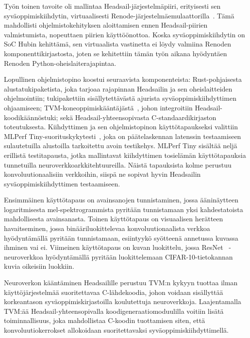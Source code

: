 \documentclass[12pt,a4paper,finnish
]{tunithesis}
\begin{document}
Työn toinen tavoite oli mallintaa Headsail-järjestelmäpiiri, erityisesti sen sy\-vä\-op\-pi\-mis\-kiih\-dy\-tin, virtuaalisesti Renode-järjestelmäemulaattorilla~\cite{renode}.
Tämä mahdollisti ohjelmistokehityksen aloittamisen ennen Headsail-piirien valmistumista, nopeuttaen piirien käyt\-töön\-ot\-to\-a.
Koska syväoppimiskiihdytin on SoC Hubin kehittämä, sen virtuaalista vastinetta ei löydy valmiina Renoden komponenttikirjastosta, joten se kehitettiin tämän työn aikana hyödyntäen Renoden Python-oheislaiterajapintaa.

Lopullinen ohjelmistopino koostui seuraavista komponenteista: Rust-pohjaisesta alustatukipaketista, joka tarjoaa rajapinnan Headsailin ja sen oheislaitteiden ohjelmointiin; tukipakettiin sisällytettävästä ajurista syväoppimiskiihdyttimen ohjaamiseen; TVM-koneoppimiskääntäjästä~\cite{TVM}, johon integroitiin Headsail-koo\-di\-kään\-nös\-tu\-ki; sekä Headsail-yhteensopivasta C-standaardikirjaston toteutuksesta.
Kiihdyttimen ja sen ohjelmistopinon käyttötapaukseksi valittiin MLPerf Tiny-suorituskykytesti~\cite{banbury_mlperf_2021}, joka on päätelaskennan latenssin testaamiseen sulautetuilla alustoilla tarkoitettu avoin testikehys.
MLPerf Tiny sisältää neljä erillistä testitapausta, jotka mallintavat kiihdyttimen tosielämän käyttötapauksia tunnetuilla neuroverkkoarkkitehtuureilla.
Näistä tapauksista kolme perustuu konvoluutionaalisiin verkkoihin, siispä ne sopivat hyvin Headsailin syväoppimiskiihdyttimen testaamiseen.

Ensimmäinen käyttötapaus on avainsanojen tunnistaminen, jossa ääninäytteen logaritmisesta mel-spektrogrammista pyritään tunnistamaan yksi kahdestatoista mahdollisesta avainsanasta.
Toinen käyttötapaus on visuaalisen herätteen havaitseminen, jossa binääriluokittelevaa konvoluutionaalista verkkoa hyödyntämällä pyritään tunnistamaan, esiintyykö syötteenä annetussa kuvassa ihminen vai ei.
Viimeinen käyttötapaus on kuvan luokittelu, jossa ResNet~\cite{he_deep_2015} -neuroverkkoa hyödyntämällä pyritään luokittelemaan CIFAR-10-tietokannan kuvia oikeisiin luokkiin.

Neuroverkon kääntäminen Headsailille perustuu TVM:n kykyyn tuottaa ilman käyttöjärjestelmää suoritettavaa C-lähdekoodia, johon voidaan sisällyttää korkeantason syväoppimiskirjastoilla koulutettuja neuroverkkoja. Laajentamalla TVM:ää Headsail-yhteensopivalla koodigeneraatiomoduulilla voitiin lisätä toiminnallisuus, joka mahdollistaa C-koodin tuottamisen siten, että konvoluutiokerrokset allokoidaan suoritettavaksi syväoppimiskiihdyttimellä.
\end{document}
